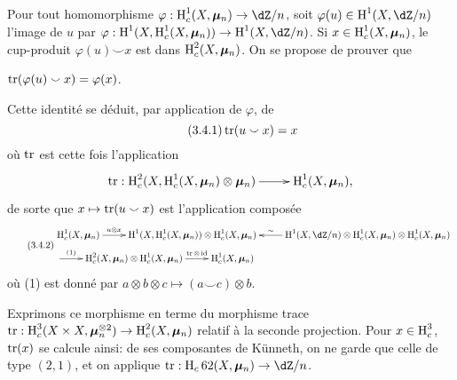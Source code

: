 \subsection{}\label{V:3-3}

Pour tout homomorphisme $\varphi:\h_c^1(X,\dmu_n)\to \dZ/n$, soit 
$\varphi(u)\in \h^1(X,\dZ/n)$ l'image de $u$ par 
$\varphi:\h^1(X,\h_c^1(X,\dmu_n)) \to \h^1(X,\dZ/n)$. Si 
$x\in \operatorname{H}_c^1(X,{\bm\mu}_n)$, le cup-produit $\varphi(u)\smallsmile x$ est dans 
$\operatorname{H}_c^2(X,{\bm\mu}_n)$. On se propose de prouver que 





\begin{proposition_}\label{V:3-4}
$\operatorname{tr}(\varphi(u)\smallsmile x) = \varphi(x)$.
\end{proposition_}

Cette identité se déduit, par application de $\varphi$, de 
\begin{equation*}\tag{3.4.1}\label{V:eq:3-4-1}
  \operatorname{tr}(u\smallsmile x) = x 
\end{equation*}
où $\operatorname{tr}$ est cette fois l'application 
\[\xymatrix{
  \tr:\h_c^2(X,\h_c^1(X,\dmu_n)\otimes\dmu_n) \ar[r] 
    & \h_c^1(X,\dmu_n) \text{,}
}\]
de sorte que $x\mapsto \operatorname{tr}(u\smallsmile x)$ est l'application composée 
\begin{equation*}\tag{3.4.2}\label{V:eq:3-4-2}
\begin{aligned}
&\xymatrix{
  \h_c^1(X,\dmu_n) \ar[r]^-{u\otimes x} 
    & \h^1(X,\h_c^1(X,\dmu_n)) \otimes \h_c^1(X,\dmu_n) 
    & \ar[l]_-\sim \h^1(X,\dZ/n)\otimes \h_c^1(X,\dmu_n) \otimes \h_c^1(X,\dmu_n)} \\ &\xymatrix{
    \ar[r]^-{(1)} 
      & \h_c^2(X,\dmu_n) \otimes \h_c^1(X,\dmu_n) \ar[r]^-{\tr\otimes\operatorname{id}} 
      & \h_c^1(X,\dmu_n)
}
\end{aligned}
\end{equation*}
où (1) est donné par 
$a\otimes b\otimes c\mapsto (a\smallsmile c)\otimes b$. 

Exprimons ce morphisme en terme du morphisme trace 
$\operatorname{tr}:\operatorname{H}_c^3(X\times X,{\bm\mu}_n^{\otimes 2}) \to \operatorname{H}_c^2(X,{\bm\mu}_n)$ relatif à la 
seconde projection. Pour $x\in \operatorname{H}_c^3$, $\operatorname{tr}(x)$ se calcule ainsi: de ses 
composantes de K\"unneth, on ne garde que celle de type $(2,1)$, et on applique 
$\tr:\h_c62(X,\dmu_n) \to \dZ/n$. 

